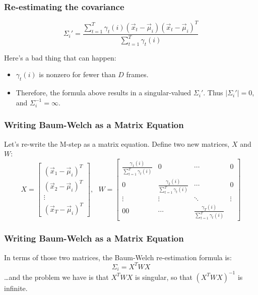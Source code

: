 \documentclass{beamer}
\begin{document}
\begin{frame}
  \frametitle{Re-estimating the covariance}

  \begin{displaymath}
    \Sigma_{i}' = \frac{\sum_{t=1}^T\gamma_t(i)(\vec{x}_{t}-\vec\mu_{i})(\vec{x}_t-\vec\mu_i)^T}{\sum_{t=1}^T\gamma_t(i)}
  \end{displaymath}

  Here's a bad thing that can happen:
  \begin{itemize}
  \item $\gamma_t(i)$ is nonzero for fewer than $D$ frames.
  \item Therefore, the formula above results in a singular-valued
    $\Sigma_i'$.  Thus $|\Sigma_i'|=0$, and $\Sigma_i^{-1}=\infty$.
  \end{itemize}
\end{frame}
  
\begin{frame}
  \frametitle{Writing Baum-Welch as a Matrix Equation}

  Let's re-write the M-step as a matrix equation.  Define two new matrices, $X$ and $W$:
  \begin{displaymath}
    X = \left[\begin{array}{c}
        (\vec{x}_1-\vec\mu_i)^T\\
        (\vec{x}_2-\vec\mu_i)^T\\
        \vdots\\
        (\vec{x}_T-\vec\mu_i)^T
      \end{array}\right],~~~
    W=\left[\begin{array}{cccc}
        \frac{\gamma_1(i)}{\sum_{t=1}^T\gamma_t(i)} & 0 & \cdots & 0\\
        0 & \frac{\gamma_2(i)}{\sum_{t=1}^T\gamma_t(i)} & \cdots & 0\\
        \vdots & \vdots & \ddots & \vdots \\
        0 0 & \cdots & \frac{\gamma_T(i)}{\sum_{t=1}^T\gamma_t(i)}
      \end{array}\right]
  \end{displaymath}
\end{frame}
  
\begin{frame}
  \frametitle{Writing Baum-Welch as a Matrix Equation}

  In  terms of those two matrices, the Baum-Welch re-estimation formula is:
  \begin{displaymath}
    \Sigma_i = X^T W X
  \end{displaymath}
  \ldots and the problem we have is that $X^TWX$ is singular, so that
  $(X^TWX)^{-1}$ is infinite.
\end{frame}
  
\end{document}
